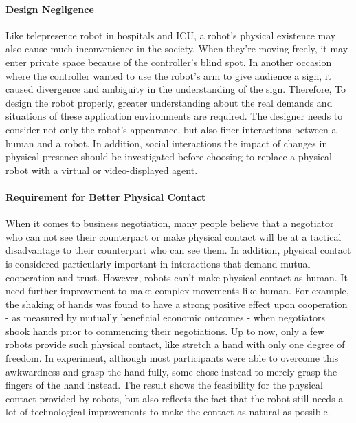 \documentclass[a4paper]{article}
\begin{document}
\paragraph{Design Negligence}
    Like telepresence robot in hospitals and ICU, a robot's physical existence may also cause much inconvenience in the society. When they're moving freely, it may enter private space because of the controller's blind spot. In another occasion where the controller wanted to use the robot's arm to give audience a sign, it caused divergence and ambiguity in the understanding of the sign. Therefore, To design the robot properly, greater understanding about the real demands and situations of these application environments are required\cite{52}. The designer needs to consider not only the robot's appearance, but also finer interactions between a human and a robot. In addition, social interactions the impact of changes in physical presence should be investigated before choosing to replace a physical robot with a virtual or video-displayed agent. 
\paragraph{Requirement for Better Physical Contact}
    When it comes to business negotiation, many people believe that a negotiator who can not see their counterpart or make physical contact will be at a tactical disadvantage to their counterpart who can see them. In addition, physical contact is considered particularly important in interactions that demand mutual cooperation and trust\cite{53}. However, robots can't make physical contact as human. It need further improvement to make complex movements like human. For example, the shaking of hands was found to have a strong positive effect upon cooperation - as measured by mutually beneficial economic outcomes - when negotiators shook hands prior to commencing their negotiations. Up to now, only a few robots provide such physical contact, like stretch a hand with only one degree of freedom. In experiment, although most participants were able to overcome this awkwardness and grasp the hand fully, some chose instead to merely grasp the fingers of the hand instead. The result shows the feasibility for the physical contact provided by robots, but also reflects the fact that the robot still needs a lot of technological improvements to make the contact as natural as possible. 
\end{document}
